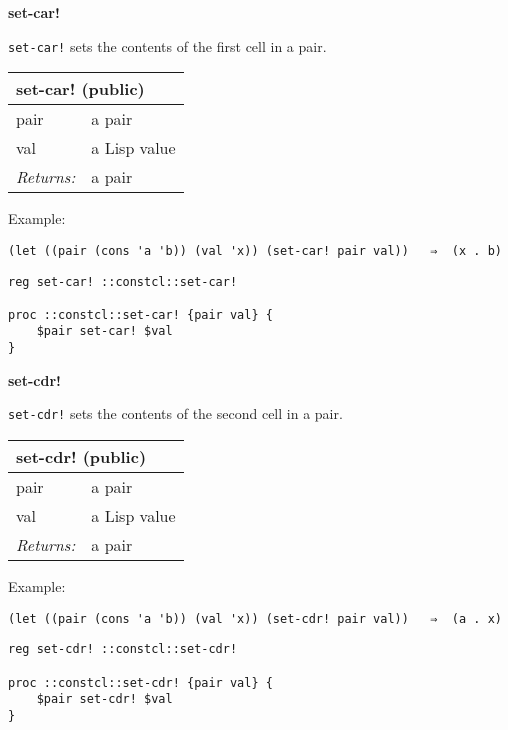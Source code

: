 \documentclass{report}
\begin{document}
\textbf{set-car!}


\texttt{set-car!} sets the contents of the first cell in a pair.

\begin{tabular}{ |l l| }
\hline
\multicolumn{2}{|l|}{set-car! (public)} \\
\hline
pair & a pair \\
val & a Lisp value \\
\textit{Returns:} & a pair \\
\hline
\end{tabular}


Example:

\noindent\makebox[\linewidth]{\rule{\linewidth}{0.4pt}}
\begin{lstlisting}
(let ((pair (cons 'a 'b)) (val 'x)) (set-car! pair val))   ⇒  (x . b)
\end{lstlisting}
\noindent\makebox[\linewidth]{\rule{\linewidth}{0.4pt}}
\noindent\makebox[\linewidth]{\rule{\linewidth}{0.4pt}}
\begin{lstlisting}
reg set-car! ::constcl::set-car!
 
proc ::constcl::set-car! {pair val} {
    $pair set-car! $val
}
\end{lstlisting}
\noindent\makebox[\linewidth]{\rule{\linewidth}{0.4pt}}

\textbf{set-cdr!}


\texttt{set-cdr!} sets the contents of the second cell in a pair.

\begin{tabular}{ |l l| }
\hline
\multicolumn{2}{|l|}{set-cdr! (public)} \\
\hline
pair & a pair \\
val & a Lisp value \\
\textit{Returns:} & a pair \\
\hline
\end{tabular}


Example:

\noindent\makebox[\linewidth]{\rule{\linewidth}{0.4pt}}
\begin{lstlisting}
(let ((pair (cons 'a 'b)) (val 'x)) (set-cdr! pair val))   ⇒  (a . x)
\end{lstlisting}
\noindent\makebox[\linewidth]{\rule{\linewidth}{0.4pt}}
\noindent\makebox[\linewidth]{\rule{\linewidth}{0.4pt}}
\begin{lstlisting}
reg set-cdr! ::constcl::set-cdr!
 
proc ::constcl::set-cdr! {pair val} {
    $pair set-cdr! $val
}
\end{lstlisting}
\noindent\makebox[\linewidth]{\rule{\linewidth}{0.4pt}}
\end{document}
